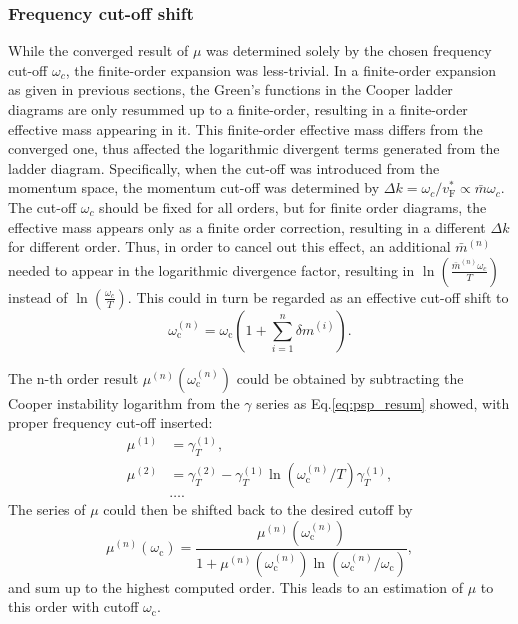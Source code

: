 \documentclass[%
 reprint,
superscriptaddress,
 amsmath,amssymb,
 aps,
prx,
]{revtex4-2}
\newcommand{\txc}{\text{c}}
\newcommand{\txF}{\text{F}}
\newcommand{\psp}{\mu} %
\begin{document}
\begin{appendices}
\subsubsection{Frequency cut-off shift}
\label{sssec:omegashift}

While the converged result of $\psp$ was determined solely by the chosen frequency cut-off $\omega_c$, the finite-order expansion was less-trivial. 
In a finite-order expansion as given in previous sections, the Green's functions in the Cooper ladder diagrams are only resummed up to a finite-order, resulting in a finite-order effective mass appearing in it. 
This finite-order effective mass differs from the converged one, thus affected the logarithmic divergent terms generated from the ladder diagram.
Specifically, when the cut-off was introduced from the momentum space, the momentum cut-off was determined by $\Delta k=\omega_c / v_\txF^* \propto \bar{m}\omega_c$.
The cut-off $\omega_c$ should be fixed for all orders, but for finite order diagrams, the effective mass appears only as a finite order correction, resulting in a different $\Delta k$ for different order.
Thus, in order to cancel out this effect, an additional $\bar{m}^{(n)}$ needed to appear in the logarithmic divergence factor, resulting in $\ln(\frac{\bar{m}^{(n)}\omega_c}{T})$ instead of $\ln(\frac{\omega_c}{T})$.
This could in turn be regarded as an effective cut-off shift to 
\begin{equation}
  \omega_{\txc}^{(n)} = \omega_{\txc}(1+\sum_{i=1}^{n}\delta m^{(i)}).
\end{equation}

The n-th order result $\psp^{(n)}(\omega_{\txc}^{(n)})$ could be obtained by subtracting the Cooper instability logarithm from the $\gamma$ series as Eq.\eqref{eq:psp_resum} showed, with proper frequency cut-off inserted:
\begin{equation}
  \begin{split}
    \psp^{(1)} &= \gamma_T^{(1)}, \\
    \psp^{(2)} &= \gamma_T^{(2)} - \gamma_T^{(1)}\ln(\omega_{\txc}^{(n)}/T)\gamma_T^{(1)},\\
    &\ldots.
  \end{split}
\end{equation}
The series of $\psp$ could then be shifted back to the desired cutoff by
\begin{equation}
  \psp^{(n)}(\omega_{\txc})=\frac{\psp^{(n)}(\omega_{\txc}^{(n)})}{1+\psp^{(n)}(\omega_{\txc}^{(n)})\ln(\omega_{\txc}^{(n)}/\omega_{\txc})},
\end{equation}
and sum up to the highest computed order. This leads to an estimation of $\psp$ to this order with cutoff $\omega_{\txc}$.


\end{appendices}
\end{document}
